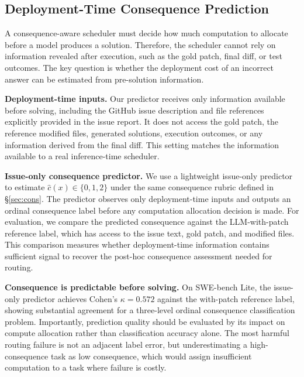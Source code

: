 \documentclass{article}
\begin{document}
\subsection{Deployment-Time Consequence Prediction}
\label{sec:pred}

A consequence-aware scheduler must decide how much computation to
allocate before a model produces a solution. Therefore, the scheduler
cannot rely on information revealed after execution, such as the gold
patch, final diff, or test outcomes. The key question is whether the
deployment cost of an incorrect answer can be estimated from
pre-solution information.

\textbf{Deployment-time inputs.}
Our predictor receives only information available before solving,
including the GitHub issue description and file references explicitly
provided in the issue report. It does not access the gold patch, the
reference modified files, generated solutions, execution outcomes, or
any information derived from the final diff. This setting matches the
information available to a real inference-time scheduler.

\textbf{Issue-only consequence predictor.}
We use a lightweight issue-only predictor to estimate
$\hat{c}(x)\in\{0,1,2\}$ under the same consequence rubric defined in
\S\ref{sec:cons}. The predictor observes only deployment-time inputs and
outputs an ordinal consequence label before any computation allocation
decision is made.
For evaluation, we compare the predicted consequence against the
LLM-with-patch reference label, which has access to the issue text,
gold patch, and modified files. This comparison measures whether
deployment-time information contains sufficient signal to recover the
post-hoc consequence assessment needed for routing.

\textbf{Consequence is predictable before solving.}
On SWE-bench Lite, the issue-only predictor achieves
Cohen's $\kappa=0.572$ against the with-patch reference label,
showing substantial agreement for a three-level ordinal consequence
classification problem. Importantly, prediction quality should be
evaluated by its impact on compute allocation rather than classification
accuracy alone. The most harmful routing failure is not an adjacent
label error, but underestimating a high-consequence task as low
consequence, which would assign insufficient computation to a task where
failure is costly.
\end{document}
